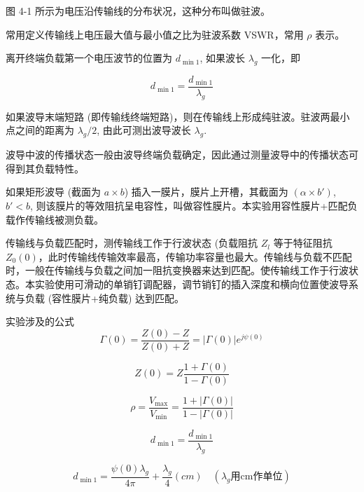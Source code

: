 \documentclass[12pt,a4paper,UTF8]{article}
\begin{document}
图 4-1 所示为电压沿传输线的分布状况，这种分布叫做驻波。

常用定义传输线上电压最大值与最小值之比为驻波系数 VSWR，常用 $\rho$ 表示。

离开终端负载第一个电压波节的位置为 $d_{\min 1}$, 如果波长 $\lambda_g$ 一化，即

\begin{equation}
d_{\min 1} = \frac{d_{\min 1}}{\lambda_g}
\end{equation}

如果波导末端短路 (即传输线终端短路)，则在传输线上形成纯驻波。驻波两最小点之间的距离为 $\lambda_g/2$, 由此可测出波导波长 $\lambda_g$.

波导中波的传播状态一般由波导终端负载确定，因此通过测量波导中的传播状态可得到其负载特性。

如果矩形波导 (截面为 $a \times b$) 插入一膜片，膜片上开槽，其截面为 $(\alpha \times b')$, $b' < b$, 则该膜片的等效阻抗呈电容性，叫做容性膜片。本实验用容性膜片+匹配负载作传输线被测负载。

传输线与负载匹配时，测传输线工作于行波状态 (负载阻抗 $Z_l$ 等于特征阻抗 $Z_0(0)$，此时传输线传输效率最高，传输功率容量也最大。传输线与负载不匹配时，一般在传输线与负载之间加一阻抗变换器来达到匹配。使传输线工作于行波状态。本实验使用可滑动的单销钉调配器，调节销钉的插入深度和横向位置使波导系统与负载 (容性膜片+纯负载) 达到匹配。

实验涉及的公式
\begin{equation}
\Gamma(0) = \frac{Z(0) - Z}{Z(0) + Z} = |\Gamma(0)| e^{j\psi(0)} \tag{式 4-3}
\end{equation}

\begin{equation}
Z(0) = Z \frac{1 + \Gamma (0)}{1 - \Gamma (0)} \tag{式 4-4}
\end{equation}

\begin{equation}
\rho = \frac{V_{\max}}{V_{\min}} = \frac{1 + |\Gamma (0)|}{1 - |\Gamma (0)|} \tag{式 4-5}
\end{equation}

\begin{equation}
d_{\min 1} = \frac{d_{\min 1}}{\lambda_g} \tag{式 4-6}
\end{equation}

\begin{equation}
d_{\min 1} = \frac{\psi(0)\lambda_g}{4 \pi} + \frac{\lambda_g}{4} (cm)\quad (\lambda_g \text{用} \text{cm} \text{作单位}) \tag{式 4-7}
\end{equation}
\end{document}
